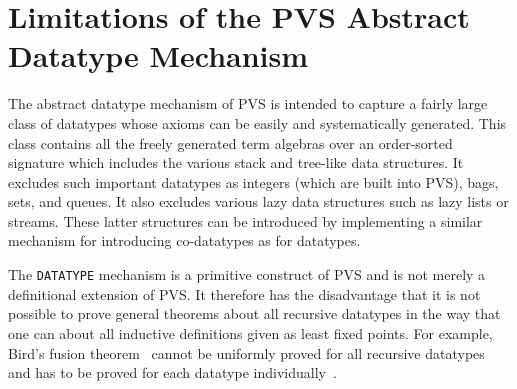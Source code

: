 \documentclass[11pt,twoside]{book}
\begin{document}









\chapter{Limitations of the PVS Abstract Datatype
Mechanism}\label{limitations} 

The abstract datatype mechanism of PVS is intended to capture a fairly
large class of datatypes whose axioms can be easily and systematically
generated.  This class contains all the freely generated term algebras
over an order-sorted signature which includes the various stack and
tree-like data structures.  It excludes such important datatypes as
integers (which are built into PVS), bags, sets, and queues.  It also
excludes various lazy data structures such as lazy lists or streams.
These latter structures can be introduced by implementing
a similar mechanism for introducing co-datatypes as for datatypes.

 The \texttt{DATATYPE} mechanism is a primitive construct of PVS and
is not merely a definitional extension of PVS.  It therefore has
the disadvantage that it is not possible to prove general
theorems about all recursive datatypes in the way that one can
about all inductive definitions given as least fixed points.
For example, Bird's fusion theorem~\cite{Bird:MPC95} cannot be uniformly
proved for all recursive datatypes and has to be proved for each datatype
individually~\cite{Shankar:SCP96}. 
\end{document}
